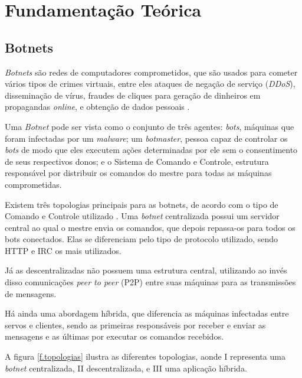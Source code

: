 \chapter{Fundamentação Teórica}
\label{c.fundamentacao}

\section{Botnets}

\textit{Botnets} são redes de computadores comprometidos, que são usados para cometer vários tipos de crimes virtuais, entre eles ataques de negação de serviço (\textit{DDoS}), disseminação de vírus, fraudes de cliques para geração de dinheiros em propagandas \textit{online}, e obtenção de dados pessoais \cite{ianelli2005botnets}.

Uma \textit{Botnet} pode ser vista como o conjunto de três agentes: \textit{bots}, máquinas que foram infectadas por um \textit{malware}; um \textit{botmaster}, pessoa capaz de controlar os \textit{bots} de modo que eles executem ações determinadas por ele sem o consentimento de seus respectivos donos; e o Sistema de Comando e Controle, estrutura responsável por distribuir os comandos do mestre para todas as máquinas comprometidas. \cite{miller2016role}

Existem três topologias principais para as botnets, de acordo com o tipo de Comando e Controle utilizado \cite{jang2009analysis}. Uma \textit{botnet} centralizada possui um servidor central ao qual o mestre envia os comandos, que depois repassa-os para todos os bots conectados. Elas se diferenciam pelo tipo de protocolo utilizado, sendo HTTP e IRC os mais utilizados.

Já as descentralizadas não possuem uma estrutura central, utilizando ao invés disso comunicações \textit{peer to peer} (P2P) entre suas máquinas para as transmissões de mensagens. 

Há ainda uma abordagem híbrida, que diferencia as máquinas infectadas entre servos e clientes, sendo as primeiras responsáveis por receber e enviar as mensagens e as últimas por executar os comandos recebidos. 

A figura \ref{f.topologias} ilustra as diferentes topologias, aonde I representa uma \textit{botnet} centralizada, II descentralizada, e III uma aplicação híbrida.

